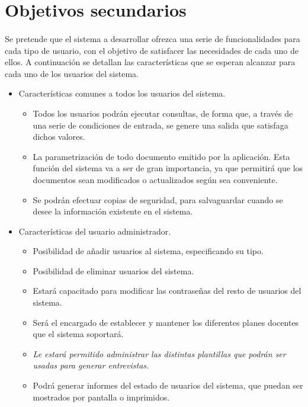 \section{Objetivos secundarios}

\paragraph{}Se pretende que el sistema a desarrollar ofrezca una serie de
funcionalidades para cada tipo de usuario, con el objetivo de satisfacer las
necesidades de cada uno de ellos. A continuación se detallan las características
que se esperan alcanzar para cada uno de los usuarios del sistema.


\begin{itemize}
   \item Características comunes a todos los usuarios del sistema.
      \begin{itemize}
         \item Todos los usuarios podrán ejecutar consultas, de forma que, a
         través de una serie de condiciones de entrada, se genere una salida que
         satisfaga dichos valores.
         \item La parametrización de todo documento emitido por la aplicación.
         Esta función del sistema va a ser de gran importancia, ya que permitirá
         que los documentos sean modificados o actualizados según sea
         conveniente.
         \item Se podrán efectuar copias de seguridad, para salvaguardar cuando
         se desee la información existente en el sistema.
      \end{itemize}

   \item Características del usuario administrador.
      \begin{itemize}
         \item Posibilidad de añadir usuarios al sistema, especificando su tipo.
         \item Posibilidad de eliminar usuarios del sistema.
         \item Estará capacitado para modificar las contraseñas del resto de
         usuarios del sistema.
         \item Será el encargado de establecer y mantener los diferentes planes
         docentes que el sistema soportará.
         \item \textit{Le estará permitido administrar las distintas plantillas
         que podrán ser usadas para generar entrevistas.}
         \item Podrá generar informes del estado de usuarios del sistema, que
         puedan ser mostrados por pantalla o imprimidos.
      \end{itemize}



\end{itemize}
